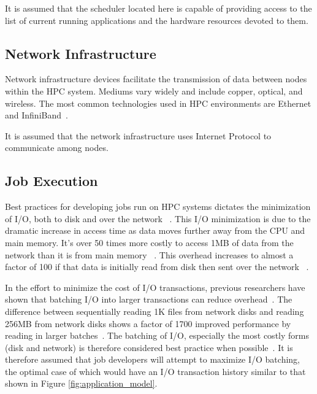 \documentclass[oneside,12pt]{memoir}
\begin{document}
It is assumed that the scheduler located here is capable of providing access to the list of current running applications and the hardware resources devoted to them. 
\subsection{Network Infrastructure}
Network infrastructure devices facilitate the transmission of data between nodes within the HPC system. Mediums vary widely and include copper, optical, and wireless. The most common technologies used in HPC environments are Ethernet and InfiniBand~\cite{bozzo2006design}\cite{madai2010performance}. 

It is assumed that the network infrastructure uses Internet Protocol to communicate among nodes.

\subsection{Job Execution}
Best practices for developing jobs run on HPC systems dictates the minimization of I/O, both to disk and over the network ~\cite{shan2007using}. This I/O minimization is due to the dramatic increase in access time as data moves further away from the CPU and main memory. It's over 50 times more costly to access 1MB of data from the network than it is from main memory ~\cite{dean2009designs}. This overhead increases to almost a factor of 100 if that data is initially read from disk then sent over the network ~\cite{dean2009designs}.

In the effort to minimize the cost of I/O transactions, previous researchers have shown that batching I/O into larger transactions can reduce overhead~\cite{shan2008characterizing}. The difference between sequentially reading 1K files from network disks and reading 256MB from network disks shows a factor of 1700 improved performance by reading in larger batches~\cite{shan2007using}. The batching of I/O, especially the most costly forms (disk and network) is therefore considered best practice when possible~\cite{borrill2007investigation}. It is therefore assumed that job developers will attempt to maximize I/O batching, the optimal case of which would have an I/O transaction history similar to that shown in Figure \ref{fig:application_model}.
\end{document}
